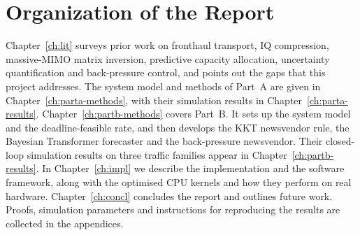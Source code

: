 \section{Organization of the Report}

Chapter~\ref{ch:lit} surveys prior work on fronthaul transport, IQ compression, massive-MIMO matrix inversion, predictive capacity allocation, uncertainty quantification and back-pressure control, and points out the gaps that this project addresses. The system model and methods of Part~A are given in Chapter~\ref{ch:parta-methods}, with their simulation results in Chapter~\ref{ch:parta-results}. Chapter~\ref{ch:partb-methods} covers Part~B. It sets up the system model and the deadline-feasible rate, and then develops the KKT newsvendor rule, the Bayesian Transformer forecaster and the back-pressure newsvendor. Their closed-loop simulation results on three traffic families appear in Chapter~\ref{ch:partb-results}. In Chapter~\ref{ch:impl} we describe the implementation and the software framework, along with the optimised CPU kernels and how they perform on real hardware. Chapter~\ref{ch:concl} concludes the report and outlines future work. Proofs, simulation parameters and instructions for reproducing the results are collected in the appendices.

